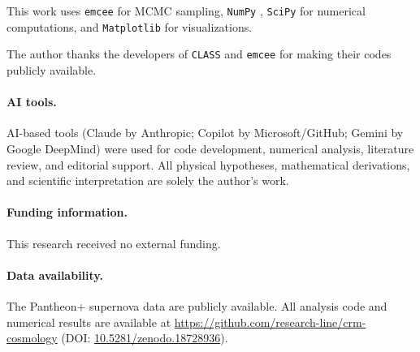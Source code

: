 \documentclass[aps,prd,twocolumn,superscriptaddress,nofootinbib]{revtex4-2}
\begin{document}
This work uses \texttt{emcee} \cite{ForemanMackey2013} for MCMC sampling, \texttt{NumPy} \cite{Harris2020}, \texttt{SciPy} \cite{Virtanen2020} for numerical computations, and \texttt{Matplotlib} \cite{Hunter2007} for visualizations.

\begin{acknowledgments}
The author thanks the developers of \texttt{CLASS} \cite{Blas2011} and
\texttt{emcee} \cite{ForemanMackey2013} for making their codes publicly
available.

\paragraph{AI tools.}
AI-based tools (Claude by Anthropic; Copilot by Microsoft/GitHub; Gemini by Google DeepMind) were used
for code development, numerical analysis, literature review, and editorial
support. All physical hypotheses, mathematical derivations, and scientific
interpretation are solely the author's work.
\end{acknowledgments}

\paragraph{Funding information.}
This research received no external funding.

\paragraph{Data availability.}
The Pantheon+ supernova data \cite{Scolnic2022} are publicly available.
All analysis code and numerical results are available at
\url{https://github.com/research-line/crm-cosmology}
(DOI: \href{https://doi.org/10.5281/zenodo.18728936}{10.5281/zenodo.18728936}).
\end{document}
